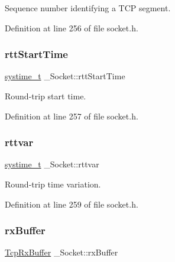 Sequence number identifying a T\+CP segment. 



Definition at line 256 of file socket.\+h.

\mbox{\label{struct__Socket_a061c165f4f0faf864a177f074078caf5}} 
\subsubsection{\texorpdfstring{rtt\+Start\+Time}{rttStartTime}}
{\footnotesize\ttfamily \hyperlink{compiler__port_8h_ae3e32a98d431a02106616da3071832dd}{systime\+\_\+t} \+\_\+\+Socket\+::rtt\+Start\+Time}



Round-\/trip start time. 



Definition at line 257 of file socket.\+h.

\mbox{\label{struct__Socket_a5c886d6854b06dadf539a115107a39a0}} 
\subsubsection{\texorpdfstring{rttvar}{rttvar}}
{\footnotesize\ttfamily \hyperlink{compiler__port_8h_ae3e32a98d431a02106616da3071832dd}{systime\+\_\+t} \+\_\+\+Socket\+::rttvar}



Round-\/trip time variation. 



Definition at line 259 of file socket.\+h.

\mbox{\label{struct__Socket_af51421eecdfec26a8203db084bcc26c6}} 
\subsubsection{\texorpdfstring{rx\+Buffer}{rxBuffer}}
{\footnotesize\ttfamily \hyperlink{structTcpRxBuffer}{Tcp\+Rx\+Buffer} \+\_\+\+Socket\+::rx\+Buffer}



